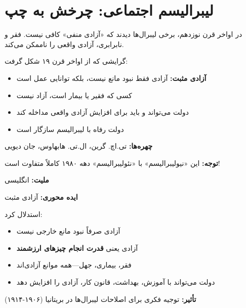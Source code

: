 \section{لیبرالیسم اجتماعی: چرخش به چپ}

در اواخر قرن نوزدهم، برخی لیبرال‌ها دیدند که «آزادی منفی» کافی نیست. فقر و نابرابری، آزادی واقعی را ناممکن می‌کند.

\begin{defbox}
گرایشی که از اواخر قرن ۱۹ شکل گرفت:
\begin{itemize}[nosep]
    \item \textbf{آزادی مثبت:} آزادی فقط نبود مانع نیست، بلکه توانایی عمل است
    \item کسی که فقیر یا بیمار است، آزاد نیست
    \item دولت می‌تواند و باید برای افزایش آزادی واقعی مداخله کند
    \item دولت رفاه با لیبرالیسم سازگار است
\end{itemize}

\textbf{چهره‌ها:} تی.اچ. گرین، ال.تی. هابهاوس، جان دیویی

\textbf{توجه:} این «نیولیبرالیسم» با «نئولیبرالیسم» دهه ۱۹۸۰ کاملاً متفاوت است!
\end{defbox}

\begin{personbox}[تی.اچ. گرین (۱۸۳۶-۱۸۸۲)]

\textbf{ملیت:} انگلیسی

\textbf{ایده محوری:} آزادی مثبت

\mediumspace

 استدلال کرد:

\begin{itemize}[nosep]
    \item آزادی صرفاً نبود مانع خارجی نیست
    \item آزادی یعنی \textbf{قدرت انجام چیزهای ارزشمند}
    \item فقر، بیماری، جهل—همه موانع آزادی‌اند
    \item دولت می‌تواند با آموزش، بهداشت، قانون کار، آزادی را افزایش دهد
\end{itemize}

\mediumspace

\textbf{تأثیر:} توجیه فکری برای اصلاحات لیبرال‌ها در بریتانیا (۱۹۰۶-۱۹۱۴)
\end{personbox}

